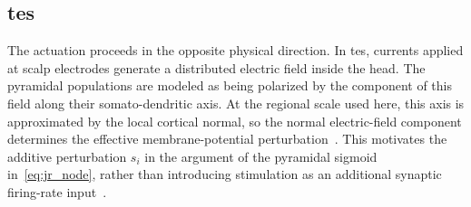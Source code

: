 \subsection{\acl{tes}}
\label{sec:stimulation_interface}

The actuation proceeds in the opposite physical direction.
In \ac{tes}, currents applied at scalp electrodes generate a distributed electric field inside the head.
The pyramidal populations are modeled as being polarized by the component of this field along their somato-dendritic axis.
At the regional scale used here, this axis is approximated by the local cortical normal, so the normal electric-field component determines the effective membrane-potential perturbation~\cite{Buzsaki2012}. %
This motivates the additive perturbation $s_i$ in the argument of the pyramidal sigmoid in~\eqref{eq:jr_node}, rather than introducing stimulation as an additional synaptic firing-rate input~\cite{Kunze2016,Merlet2013,Yu2024}. %

